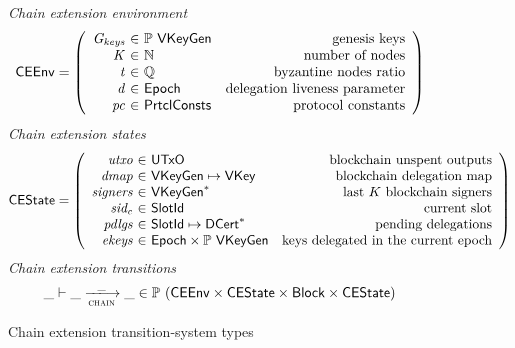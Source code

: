 \begin{figure}
  \emph{Chain extension environment}
  \begin{equation*}
    \CEEnv =
    \left(
      \begin{array}{r@{~\in~}lr}
        \var{\Gkeys} & \powerset{\VKeyGen} & \text{genesis keys}\\
        \var{K} & \mathbb{N} & \text{number of nodes}\\
        \var{t} & \mathbb{Q} & \text{byzantine nodes ratio}\\
        \var{d} & \Epoch & \text{delegation liveness parameter}\\
        \var{pc} & \PrtclConsts & \text{protocol constants}\\
      \end{array}
    \right)
  \end{equation*}
  \emph{Chain extension states}
  \begin{equation*}
    \CEState =
    \left(
      \begin{array}{r@{~\in~}lr}
        \var{utxo} & \UTxO & \text{blockchain unspent outputs}\\
        \var{dmap} & \VKeyGen \mapsto \VKey & \text{blockchain delegation map}\\
        \var{signers} & \seqof{\VKeyGen} & \text{last $K$ blockchain signers}\\
        \var{sid_c} & \SlotId & \text{current slot}\\
        \var{pdlgs} & \SlotId \mapsto \seqof{\DCert} & \text{pending delegations}\\
        \var{ekeys} & \Epoch \times \powerset{\VKeyGen} & \text{keys delegated in the current epoch}
      \end{array}
    \right)
  \end{equation*}
  \emph{Chain extension transitions}
  \begin{equation*}
    \_ \vdash \_ \trans{chain}{\_} \_ \in
      \powerset (\CEEnv \times \CEState \times \Block \times \CEState)
  \end{equation*}
  \caption{Chain extension transition-system types}
  \label{fig:ts-types:chain-extension}
\end{figure}

